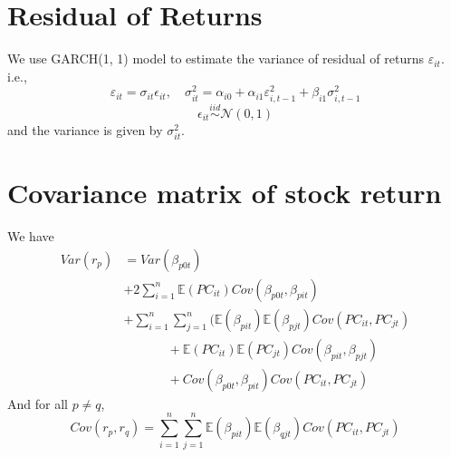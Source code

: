 \documentclass{article}
\begin{document}
\section{Residual of Returns}
We use GARCH(1, 1) model to estimate the variance of residual of returns $\varepsilon_{it}$. i.e., 
\begin{equation*}
	\varepsilon_{it}=\sigma_{it} \epsilon_{it}, \quad \sigma_{it}^2=\alpha_{i0}+\alpha_{i1} \varepsilon_{i,t-1}^2+ \beta_{i1} \sigma_{i,t-1}^2
\end{equation*}
\begin{equation*}
    \epsilon_{it} \stackrel{iid}{\sim} \mathcal{N}(0, 1)
\end{equation*}
and the variance is given by $\sigma_{it}^2$.

\section{Covariance matrix of stock return}
We have
\begin{align*}
    Var(r_p)&=Var(\beta_{p0t}) \\
    &+2\sum_{i=1}^n \mathbb{E}(PC_{it})Cov(\beta_{p0t},\beta_{pit}) \\
    &+\sum_{i=1}^n\sum_{j=1}^n(\mathbb{E}(\beta_{pit})\mathbb{E}(\beta_{pjt})Cov(PC_{it},PC_{jt}) \\
    &\qquad\quad\;\,+\mathbb{E}(PC_{it})\mathbb{E}(PC_{jt})Cov(\beta_{pit}, \beta_{pjt}) \\
    &\qquad\quad\;\,+Cov(\beta_{p0t},\beta_{pit})Cov(PC_{it},PC_{jt})
\end{align*}
And for all $p\neq q$,
\begin{equation*}
    Cov(r_p, r_q) = \sum_{i=1}^n\sum_{j=1}^n\mathbb{E}(\beta_{pit})\mathbb{E}(\beta_{qjt})Cov(PC_{it}, PC_{jt})
\end{equation*}
    
\end{document}
